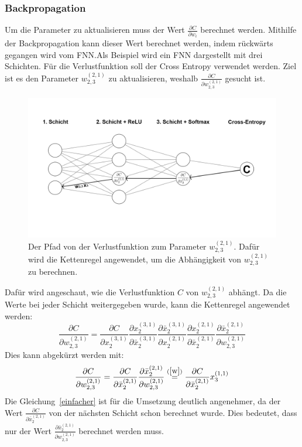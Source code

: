 \documentclass[11pt]{article}
\begin{document}
\subsubsection{Backpropagation}\label{back}
Um die Parameter zu aktualisieren muss der Wert $\frac{\partial C}{\partial w_{i}}$ berechnet werden. Mithilfe der Backpropagation kann dieser Wert
berechnet werden, indem rückwärts gegangen wird vom FNN.\@ Als Beispiel wird ein FNN dargestellt mit drei Schichten. Für die Verlustfunktion soll der
Cross Entropy verwendet werden. Ziel ist es den Parameter $w_{2,3}^{(2,1)}$ zu aktualisieren, weshalb $\frac{\partial C}{\partial w_{2,3}^{(2,1)}}$ gesucht ist.
\begin{figure}[h]
    \centering
    \includegraphics[width=400pt, keepaspectratio]{images/beispiel}
    \caption[Beispiel eines FNNs]{Der Pfad von der Verlustfunktion zum Parameter $w_{2,3}^{(2,1)}$. Dafür wird die Kettenregel angewendet, um die Abhängigkeit von $w_{2,3}^{(2,1)}$ zu berechnen.}
\end{figure}
Dafür wird angeschaut, wie die Verlustfunktion $C$ von $w_{2,3}^{(2,1)}$ abhängt.
Da die Werte bei jeder Schicht weitergegeben wurde, kann die Kettenregel angewendet werden:
\begin{equation}
    \frac{\partial C}{\partial w_{2,3}^{(2,1)}} = \frac{\partial C}{\partial x_2^{(3,1)}} \frac{\partial x_2^{(3,1)}}{\partial \bar{x}_2^{(3,1)}}
    \frac{\partial \bar{x}_2^{(3,1)}}{\partial x_2^{(2,1)}} \frac{\partial x_2^{(2,1)}}{\partial \bar{x}_2^{(2,1)}}
    \frac{\partial \bar{x}_2^{(2,1)}}{\partial w_{2,3}^{(2,1)}}
\end{equation}
Dies kann abgekürzt werden mit:
\begin{equation}\label{einfacher}
    \frac{\partial C}{\partial w_{2,3}^{(2,1)}} = \frac{\partial C}{\partial \bar{x}_2^{(2,1)}} \frac{\partial \bar{x}_2^{(2,1)}}{\partial w_{2,3}^{(2,1)}} \stackrel{(\ref{w})}{=} \frac{\partial C}{\partial \bar{x}_2^{(2,1)}} x_3^{(1,1)}
\end{equation}
Die Gleichung~\ref{einfacher} ist für die Umsetzung deutlich angenehmer, da der Wert $\frac{\partial C}{\partial \bar{x}_2^{(2,1)}}$ von der nächsten Schicht
schon berechnet wurde. Dies bedeutet, dass nur der Wert $\frac{\partial \bar{x}_2^{(2,1)}}{\partial w_{2,3}^{(2,1)}}$ berechnet werden muss.
\end{document}
